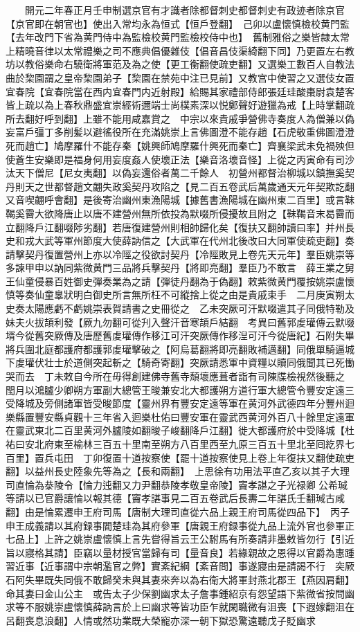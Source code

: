 　　開元二年春正月壬申制選京官有才識者除都督刺史都督刺史有政迹者除京官【京官即在朝官也】使出入常均永為恒式【恒戶登翻】　己卯以盧懷慎檢校黄門監【去年改門下省為黄門侍中為監檢校黄門監檢校侍中也】　舊制雅俗之樂皆隸太常上精曉音律以太常禮樂之司不應典倡優雜伎【倡音昌伎渠綺翻下同】乃更置左右教坊以教俗樂命右驍衛將軍范及為之使【更工衡翻使疏吏翻】又選樂工數百人自教法曲於棃園謂之皇帝棃園弟子【棃園在禁苑中注已見前】又教宫中使習之又選伎女置宜春院【宜春院當在西内宜春門内近射殿】給賜其家禮部侍郎張廷珪酸棗尉袁楚客皆上疏以為上春秋鼎盛宜崇經術邇端士尚樸素深以悦鄭聲好遊獵為戒【上時掌翻疏所去翻好呼到翻】上雖不能用咸嘉賞之　中宗以來貴戚爭營佛寺奏度人為僧兼以偽妄富戶彊丁多削髪以避徭役所在充滿姚崇上言佛圖澄不能存趙【石虎敬重佛圖澄澄死而趙亡】鳩摩羅什不能存秦【姚興師鳩摩羅什興死而秦亡】齊襄梁武未免禍殃但使蒼生安樂即是福身何用妄度姦人使壞正法【樂音洛壞音怪】上從之丙寅命有司沙汰天下僧尼【尼女夷翻】以偽妄還俗者萬二千餘人　初營州都督治柳城以鎮撫奚契丹則天之世都督趙文翽失政奚契丹攻陷之【見二百五卷武后萬歲通天元年契欺訖翻又音喫翽呼會翻】是後寄治幽州東漁陽城【據舊書漁陽城在幽州東二百里】或言靺鞨奚霫大欲降唐止以唐不建營州無所依投為默啜所侵擾故且附之【靺鞨音末曷霫而立翻降戶江翻啜陟劣翻】若唐復建營州則相帥歸化矣【復扶又翻帥讀曰率】并州長史和戎大武等軍州節度大使薛訥信之【大武軍在代州北後改曰大同軍使疏吏翻】奏請擊契丹復置營州上亦以冷陘之役欲討契丹【冷陘敗見上卷先天元年】羣臣姚崇等多諫甲申以訥同紫微黄門三品將兵擊契丹【將即亮翻】羣臣乃不敢言　薛王業之舅王仙童侵暴百姓御史彈奏業為之請【彈徒丹翻為于偽翻】敕紫微黄門覆按姚崇盧懷慎等奏仙童辠狀明白御史所言無所枉不可縱捨上從之由是貴戚束手　二月庚寅朔太史奏太陽應虧不虧姚崇表賀請書之史冊從之　乙未突厥可汗默啜遣其子同俄特勒及妹夫火拔頡利發【厥九勿翻可從刋入聲汗音寒頡戶結翻　考異曰舊郭䖍瓘傳云默啜壻今從舊突厥傳及唐歷舊䖍瓘傳作移江可汗突厥傳作移湼可汗今從唐紀】石附失畢將兵圍北庭都護府都護郭䖍瓘擊破之【阿烏葛翻將即亮翻敗補邁翻】同俄單騎逼城下䖍瓘伏壮士於道側突起斬之【騎奇寄翻】突厥請悉軍中資糧以贖同俄聞其已死慟哭而去　丁未敕自今所在毋得創建佛寺舊寺頹壞應葺者詣有司陳牒檢視然後聽之　閠月以鴻臚少卿朔方軍副大總管王晙兼安北大都護朔方道行軍大總管令豐安定遠三受降城及旁側諸軍皆受晙節度【靈州界有豐安定遠等軍在黄河外武德四年分豐州迴樂縣置豐安縣貞觀十三年省入迴樂杜佑曰豐安軍在靈武西黄河外百八十餘里定遠軍在靈武東北二百里黄河外臚陵如翻晙子峻翻降戶江翻】徙大都護府於中受降城【杜祐曰安北府東至榆林三百五十里南至朔方八百里西至九原三百五十里北至囘紇界七百里】置兵屯田　丁卯復置十道按察使【罷十道按察使見上卷上年復扶又翻使疏吏翻】以益州長史陸象先等為之【長和兩翻】　上思徐有功用法平直乙亥以其子大理司直惀為㳟陵令【惀力迍翻又力尹翻恭陵孝敬皇帝陵】竇孝諶之子光禄卿公希瑊等請以已官爵讓惀以報其德【竇孝諶事見二百五卷武后長夀二年諶氏壬翻瑊古咸翻】由是惀累遷申王府司馬【唐制大理司直從六品上親王府司馬從四品下】　丙子申王成義請以其府録事閻楚珪為其府參軍【唐親王府録事從九品上流外官也參軍正七品上】上許之姚崇盧懷慎上言先嘗得旨云王公駙馬有所奏請非墨敕皆勿行【引近旨以寢格其請】臣竊以量材授官當歸有司【量音良】若緣親故之恩得以官爵為惠踵習近事【近事謂中宗朝濫官之弊】實紊紀綱【紊音問】事遂寢由是請謁不行　突厥石阿失畢既失同俄不敢歸癸未與其妻來奔以為右衛大將軍封燕北郡王【燕因肩翻】命其妻曰金山公主　或告太子少保劉幽求太子詹事鍾紹京有怨望語下紫微省按問幽求等不服姚崇盧懷慎薛訥言於上曰幽求等皆功臣乍就閑職微有沮喪【下遐嫁翻沮在呂翻喪息浪翻】人情或然功業既大榮寵亦深一朝下獄恐驚遠聽戊子貶幽求